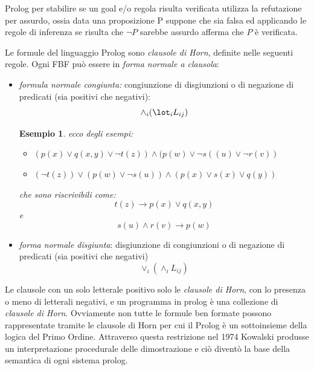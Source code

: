 \documentclass[a4paper]{report}
\newtheorem{esempio}{Esempio}
\begin{document}
Prolog per stabilire se un goal e/o regola risulta verificata utilizza la refutazione per assurdo, ossia data una proposizione P suppone che
sia falsa ed applicando le regole di inferenza se risulta che $\neg P$ sarebbe assurdo afferma che $P$ è verificata.

Le formule del linguaggio Prolog sono \emph{clausole di Horn}, definite nelle seguenti regole.
Ogni FBF può essere in \textit{forma normale a clausola}:
\begin{itemize}
\item \textit{formula normale congiunta:} congiunzione di disgiunzioni o di negazione di predicati (sia positivi che negativi):
  \begin{equation*}
    \land_i(\lot_iL_{ij})
  \end{equation*}
\begin{esempio}
ecco degli esempi:
\begin{itemize}
\item $(p(x)\vee q(x,y)\vee \neg t(z))\wedge(p(w)\vee\neg s((u)\vee \neg r(v))$
\item $(\neg t(z))\vee (p(w)\vee\neg s(u))\wedge (p(x)\vee s(x)\vee q(y))$
\end{itemize}
che sono riscrivibili come:
$$t(z)\to p(x)\vee q(x,y)$$
e
$$s(u)\wedge r(v)\to p(w)$$
\end{esempio}
\item \textit{forma normale disgiunta}: disgiunzione di congiunzioni o di negazione di predicati (sia positivi che negativi)
  \begin{equation*}
    \lor_i(\land_i L_{ij})
  \end{equation*}
\end{itemize}
Le clausole con un solo letterale positivo solo le \textit{clausole di Horn}, con lo presenza o meno di letterali negativi,
e un programma in prolog è una collezione di \textit{clausole di Horn}.\newline
Ovviamente non tutte le formule ben formate possono rappresentate tramite le clausole di Horn per cui il Prolog è un sottoinsieme
della logica del Primo Ordine.\newline
Attraverso questa restrizione nel 1974 Kowalski produsse un interpretazione procedurale delle dimostrazione e ciò diventò la base
della semantica di ogni sistema prolog.
\end{document}
